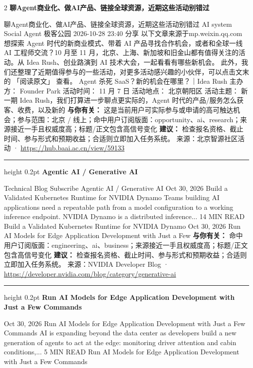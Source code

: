 \documentclass[10.5pt]{ctexart}
\begin{document}
\begin{multicols}{2}
{\large\bfseries 聊Agent商业化、做AI产品、链接全球资源，近期这些活动别错过}\par
聊Agent商业化、做AI产品、链接全球资源，近期这些活动别错过 AI system Social Agent 极客公园 2026-10-28 23:40 分享 以下文章来源于mp.weixin.qq.com 想探索 Agent 时代的新商业模式、带着 AI 产品寻找合作机会，或者和全球一线 AI 工程师交流？10 月至 11 月，北京、上海、新加坡和旧金山都有值得关注的活 动。从 Idea Rush、创业路演到 AI 技术大会，一起看看有哪些新机会。 此外，我们还整理了近期值得参与的一些活动，对更多活动感兴趣的小伙伴，可以点击文末的 「阅读原文」 查看。 Agent 杀死 SaaS？新的机会在哪里？｜Idea Rush 主办方： Founder Park 活动时间： 11 月 7 日 活动地点： 北京朝阳区 活动主题： 新一期 Idea Rush，我们打算进一步聊点更实际的，Agent 时代的产品/服务怎么获客、收费，以及新的
\textbf{与你有关：} 这是当前用户可实际参与或申请的高可触达机会；参与范围：北京 / 线上；命中用户订阅版面：opportunity、ai、research；来源接近一手且权威度高；标题/正文包含高信号变化
\textbf{建议：} 检查报名资格、截止时间、参与形式和预期收益；合适则立即加入任务系统。
{\footnotesize\color{ormuted} 来源：北京智源社区活动 · \url{https://hub.baai.ac.cn/view/59133}}
\vspace{2mm}
\hrule height 0.2pt
\vspace{2mm}
{\large\bfseries Agentic AI / Generative AI}\par
Technical Blog Subscribe Agentic AI / Generative AI Oct 30, 2026 Build a Validated Kubernetes Runtime for NVIDIA Dynamo Teams building AI applications need a repeatable path from a model configuration to a working inference endpoint. NVIDIA Dynamo is a distributed inference... 14 MIN READ Build a Validated Kubernetes Runtime for NVIDIA Dynamo Oct 30, 2026 Run AI Models for Edge Application Development with Just a Few
\textbf{与你有关：} 命中用户订阅版面：engineering、ai、business；来源接近一手且权威度高；标题/正文包含高信号变化
\textbf{建议：} 检查报名资格、截止时间、参与形式和预期收益；合适则立即加入任务系统。
{\footnotesize\color{ormuted} 来源：NVIDIA Developer Blog · \url{https://developer.nvidia.com/blog/category/generative-ai}}
\vspace{2mm}
\hrule height 0.2pt
\vspace{2mm}
{\large\bfseries Run AI Models for Edge Application Development with Just a Few Commands}\par
Oct 30, 2026 Run AI Models for Edge Application Development with Just a Few Commands AI is expanding beyond the data center as developers build a new generation of agents to act at the edge: monitoring driver attention and cabin conditions,... 5 MIN READ Run AI Models for Edge Application Development with Just a Few Commands

\end{multicols}
\end{document}

